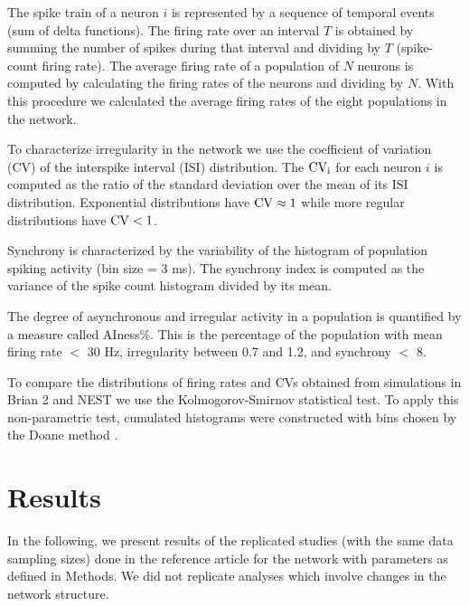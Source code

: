 \documentclass[10pt,a4paper,onecolumn]{article}
\begin{document}
The spike train of a neuron $i$ is represented by a sequence of temporal events (sum of delta functions). The firing rate over an interval $T$ is obtained by summing the number of spikes during that interval and dividing by $T$ (spike-count firing rate). The average firing rate of a population of $N$ neurons is computed by calculating the firing rates of the neurons and dividing by $N$. With this procedure we calculated the average firing rates of the eight populations in the network.

To characterize irregularity in the network we use the coefficient of variation (CV) of the interspike interval (ISI) distribution. The $\rm CV_{\rm i}$ for each neuron $i$ is computed as the ratio of the standard deviation over the mean of its ISI distribution. Exponential distributions have $\rm CV \approx 1$ while more regular distributions have $\rm CV<1$. 

Synchrony is characterized by the variability of the histogram of population spiking activity (bin size = 3 ms). The synchrony index is computed as the variance of the spike count histogram divided by its mean.

The degree of asynchronous and irregular activity in a population is quantified by a measure called AIness\%. This is the percentage of the population with mean firing rate $<$ 30 Hz, irregularity between 0.7 and 1.2, and synchrony $<$ 8. 

To compare the distributions of firing rates and CVs obtained from simulations in Brian 2 and NEST we use the Kolmogorov-Smirnov statistical test. To apply this non-parametric test, cumulated histograms were constructed with bins chosen by the Doane method \cite{doane1976}.

\section{Results}\label{results}

In the following, we present results of the replicated studies (with the same data sampling sizes) done in the reference article for the network with parameters as defined in Methods. We did not replicate analyses which involve changes in the network structure.
\end{document}
